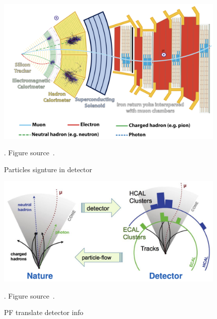 \begin{figure}[t!]
\centering
\includegraphics[width=0.99\textwidth]{figures/particles_signture_in_detector.png}
\caption[Particles signture in detector]{Particles signture in detector}. Figure source~\cite{SMtable}.                                                                        
\label{fig:Particles_in_CMS}                                                                                                               
\end{figure}

\begin{figure}[t!]
\centering
\includegraphics[width=0.99\textwidth]{figures/PF.png}
\caption[PF translate detector info]{PF translate detector info}. Figure source~\cite{SMtable}.                                                                        
\label{fig:PF_diagram}                                                                                                               
\end{figure}

